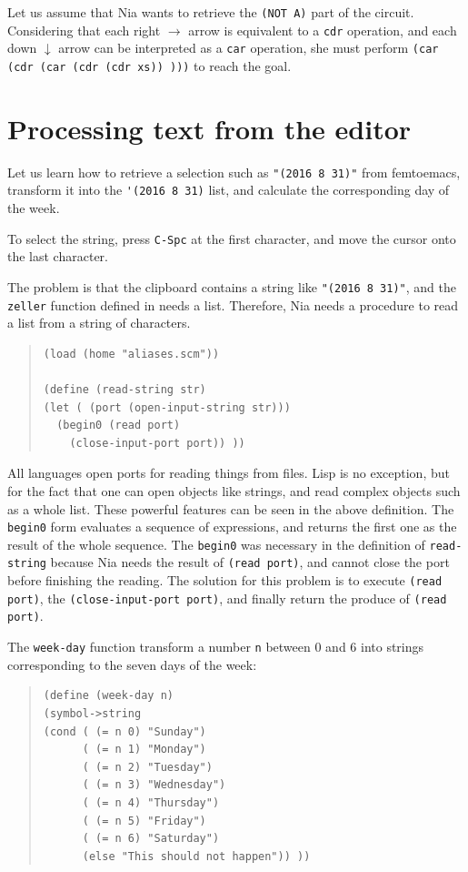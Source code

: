 \documentclass[a4paper,12pt]{book}
\begin{document}
Let us assume that Nia wants to retrieve the
\verb|(NOT A)| part of the circuit. Considering
that each right $\rightarrow$ arrow is equivalent
to a \verb|cdr| operation, and each down $\downarrow$
arrow can be interpreted as a \verb|car| operation,
she must perform \verb|(car (cdr (car (cdr (cdr xs)) )))|
to reach the goal.


\section{Processing text from the editor}
Let us learn how to retrieve a selection such as
\verb|"(2016 8 31)"| from femtoemacs,
transform it into the \verb|'(2016 8 31)|
list, and calculate the corresponding
day of the week.

To select the string, press \verb|C-Spc|
at the first character, and
move the cursor onto the last character.

The problem is that the clipboard
contains a string like \verb|"(2016 8 31)"|, and
the \verb|zeller| function defined in needs a list.
Therefore, Nia needs a procedure to
read a list from a string of characters.

\begin{quote}
\begin{verbatim}
(load (home "aliases.scm"))

(define (read-string str)
(let ( (port (open-input-string str)))
  (begin0 (read port)
    (close-input-port port)) ))
\end{verbatim}
\end{quote}

All languages open ports for reading things
from files. Lisp is no exception, but for
the fact that one can open objects like
strings, and read complex objects such
as a whole list. These powerful features
can be seen in the above definition.
The \verb|begin0| form evaluates a sequence
of expressions, and returns the first
one as the result of the whole sequence.
The \verb|begin0| was necessary in the 
definition of \verb|read-string| because
Nia needs the result of \verb|(read port)|,
and cannot close the port before finishing
the reading. The solution for this problem
is to execute \verb|(read port)|, 
the \verb|(close-input-port port)|, and
finally return the produce of \verb|(read port)|.

The \verb|week-day| function transform
a number \verb|n| between 0 and 6 into
strings corresponding to the seven
days of the week:
\begin{quote}
\begin{verbatim}
(define (week-day n)
(symbol->string
(cond ( (= n 0) "Sunday")
      ( (= n 1) "Monday")
      ( (= n 2) "Tuesday")
      ( (= n 3) "Wednesday")
      ( (= n 4) "Thursday")
      ( (= n 5) "Friday")
      ( (= n 6) "Saturday")
      (else "This should not happen")) ))
\end{verbatim}
\end{quote}
\end{document}

